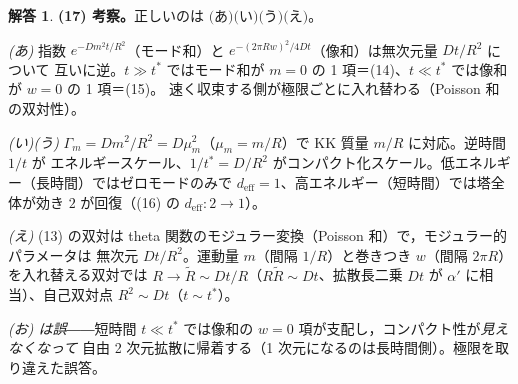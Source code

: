 \documentclass[dvipdfmx, uplatex]{jsarticle}
\theoremstyle{definition}
\newtheorem*{sol}{解答}
\begin{document}
\begin{sol}
\par\smallskip
\textbf{(17) 考察。}正しいのは $\boxed{\text{(あ)(い)(う)(え)}}$。

\textit{(あ)} 指数 $e^{-Dm^2t/R^2}$（モード和）と $e^{-(2\pi Rw)^2/4Dt}$（像和）は無次元量 $Dt/R^2$ について
互いに逆。$t\gg t^\ast$ ではモード和が $m=0$ の 1 項＝(14)、$t\ll t^\ast$ では像和が $w=0$ の 1 項＝(15)。
速く収束する側が極限ごとに入れ替わる（Poisson 和の双対性）。

\textit{(い)(う)} $\Gamma_m=Dm^2/R^2=D\mu_m^2$（$\mu_m=m/R$）で KK 質量 $m/R$ に対応。逆時間 $1/t$ が
エネルギースケール、$1/t^\ast=D/R^2$ がコンパクト化スケール。低エネルギー（長時間）ではゼロモードのみで
$d_{\mathrm{eff}}=1$、高エネルギー（短時間）では塔全体が効き $2$ が回復（(16) の $d_{\mathrm{eff}}:2\to1$）。

\textit{(え)} (13) の双対は theta 関数のモジュラー変換（Poisson 和）で，モジュラー的パラメータは
無次元 $Dt/R^2$。運動量 $m$（間隔 $1/R$）と巻きつき $w$（間隔 $2\pi R$）を入れ替える双対では
$R\to\tilde R\sim Dt/R$（$R\tilde R\sim Dt$、拡散長二乗 $Dt$ が $\alpha'$ に相当）、自己双対点 $R^2\sim Dt$（$t\sim t^\ast$）。

\textit{(お) は誤}――短時間 $t\ll t^\ast$ では像和の $w=0$ 項が支配し，コンパクト性が\emph{見えなくなって}
自由 2 次元拡散に帰着する（1 次元になるのは長時間側）。極限を取り違えた誤答。
\end{sol}
\end{document}
